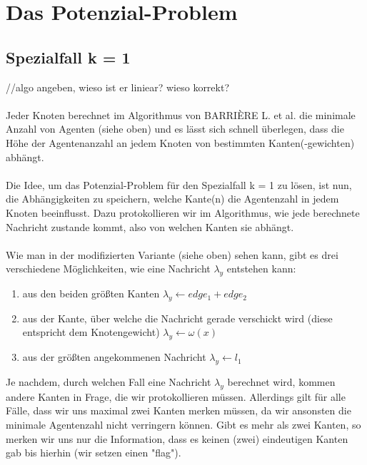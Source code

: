 \section{Das Potenzial-Problem}

\subsection{Spezialfall k = 1}
//algo angeben, wieso ist er liniear? wieso korrekt?
\\
\\
Jeder Knoten berechnet im Algorithmus von BARRIÈRE L. et al. die minimale Anzahl von Agenten (siehe oben) und es lässt sich schnell überlegen, dass die Höhe der Agentenanzahl an jedem Knoten von bestimmten Kanten(-gewichten) abhängt.
\\
\\
Die Idee, um das Potenzial-Problem für den Spezialfall k = 1 zu lösen, ist nun, die Abhängigkeiten zu speichern, welche Kante(n) die Agentenzahl in jedem Knoten beeinflusst. Dazu protokollieren wir im Algorithmus, wie jede berechnete Nachricht zustande kommt, also von welchen Kanten sie abhängt.
\\
\\ 
Wie man in der modifizierten Variante (siehe oben) sehen kann, gibt es drei verschiedene Möglichkeiten, wie eine Nachricht 	$\lambda_{y}$ entstehen kann:

\begin{enumerate}[label=\alph*)]
	
	\item aus den beiden größten Kanten $\lambda_{y} \gets edge_{1} + edge_{2}$
	
	\item aus der Kante, über welche die Nachricht gerade verschickt wird (diese entspricht dem Knotengewicht) $\lambda_{y} \gets \omega(x)$
	
	\item aus der größten angekommenen Nachricht $\lambda_{y} \gets l_{1}$

\end{enumerate}

Je nachdem, durch welchen Fall eine Nachricht $\lambda_{y}$ berechnet wird, kommen andere Kanten in Frage, die wir protokollieren müssen.
Allerdings gilt für alle Fälle, dass wir uns maximal zwei Kanten merken müssen, da wir ansonsten die minimale Agentenzahl nicht verringern können. Gibt es mehr als zwei Kanten, so merken wir uns nur die Information, dass es keinen (zwei) eindeutigen Kanten gab bis hierhin (wir setzen einen "flag").

